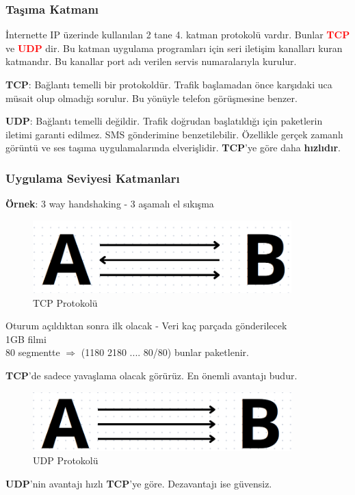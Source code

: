 \subsubsection{Taşıma Katmanı}
İnternette IP üzerinde kullanılan 2 tane 4. katman protokolü vardır.
Bunlar \textcolor{red}{\textbf{TCP}} ve \textcolor{red}{\textbf{UDP}} dir.
Bu katman uygulama programları için seri iletişim kanalları kuran katmandır.
Bu kanallar port adı verilen servis numaralarıyla kurulur.

\textbf{TCP}: Bağlantı temelli bir protokoldür.
Trafik başlamadan önce karşıdaki uca müsait olup olmadığı sorulur.
Bu yönüyle telefon görüşmesine benzer.

\textbf{UDP}: Bağlantı temelli değildir. Trafik doğrudan başlatıldığı için paketlerin iletimi garanti edilmez.
SMS gönderimine benzetilebilir. Özellikle gerçek zamanlı görüntü ve ses taşıma uygulamalarında elverişlidir.
\textbf{TCP}'ye göre daha \textbf{hızlıdır}.

\subsubsection{Uygulama Seviyesi Katmanları}
\textbf{Örnek}: 3 way handshaking - 3 aşamalı el sıkışma
\begin{figure}[!ht]
	\centering
	\includegraphics[width=10cm]{images/tcp_example}
	\caption{TCP Protokolü}
	\label{fig:tcp_example}
\end{figure}
Oturum açıldıktan sonra ilk olacak
- Veri kaç parçada gönderilecek \\
1GB filmi \\
80 segmentte $\Rightarrow$ (1180 2180 .... 80/80) bunlar paketlenir.

\textbf{TCP}'de sadece yavaşlama olacak görürüz.
En önemli avantajı budur.

\begin{figure}[!ht]
	\centering
	\includegraphics[width=10cm]{images/upd_example}
	\caption{UDP Protokolü}
	\label{fig:upd_example}
\end{figure}
\textbf{UDP}'nin avantajı hızlı  \textbf{TCP}'ye göre. Dezavantajı ise güvensiz.

